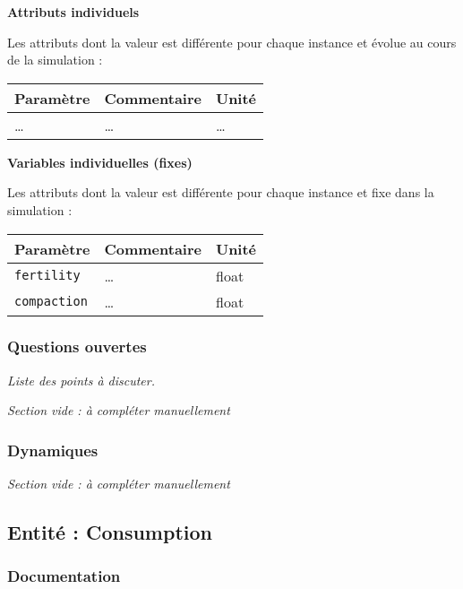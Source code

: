 \documentclass[
]{article}
\begin{document}
\textbf{Attributs individuels}

Les attributs dont la valeur est différente pour chaque instance et
évolue au cours de la simulation :

\begin{longtable}[]{@{}lll@{}}
\toprule\noalign{}
\textbf{Paramètre} & \textbf{Commentaire} & \textbf{Unité} \\
\midrule\noalign{}
\endhead
\bottomrule\noalign{}
\endlastfoot
\ldots{} & \ldots{} & \ldots{} \\
\end{longtable}

\textbf{Variables individuelles (fixes)}

Les attributs dont la valeur est différente pour chaque instance et fixe
dans la simulation :

\begin{longtable}[]{@{}lll@{}}
\toprule\noalign{}
\textbf{Paramètre} & \textbf{Commentaire} & \textbf{Unité} \\
\midrule\noalign{}
\endhead
\bottomrule\noalign{}
\endlastfoot
\texttt{fertility} & \ldots{} & float \\
\texttt{compaction} & \ldots{} & float \\
\end{longtable}

\subsubsection{Questions ouvertes}\label{questions-ouvertes-11}

\emph{Liste des points à discuter.}

\emph{Section vide : à compléter manuellement}

\subsubsection{Dynamiques}\label{dynamiques-11}

\emph{Section vide : à compléter manuellement}

\subsection{Entité : Consumption}\label{entituxe9-consumption}

\subsubsection{Documentation}\label{documentation-16}
\end{document}
